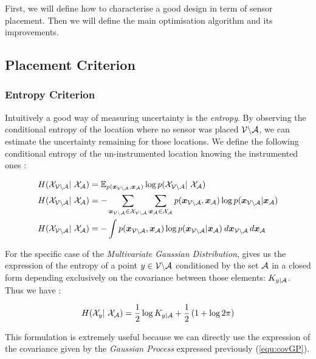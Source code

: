 First, we will define how to characterise a good design in term of sensor placement. Then we will define the main optimisation algorithm and its improvements. \\ 

\subsection{Placement Criterion}

\subsubsection{Entropy Criterion}

Intuitively a good way of measuring uncertainty is the \textit{entropy}. By observing the conditional entropy of the location where no sensor was placed $\mathcal{V} \backslash\mathcal{A}$, we can estimate the uncertainty remaining for those locations. We define the following conditional entropy of the un-instrumented location knowing the instrumented ones \citep[p.~16]{cover_elements_1991} :

\begin{align}
    H(\X_{\VA} | \X_\A) &= \mathbb{E}_{p(\vec{x}_{\VA},\vec{x}_\A)} \log p(\X_{\VA} | \X_\A) \\
    H(\X_{\VA} | \X_\A) &= - \sum_{\vec{x}_{\VA} \in \X_{\VA}}\sum_{\vec{x}_{\A} \in \X_{\A}} p(\vec{x}_{\VA},\vec{x}_\A) \log p(\vec{x}_{\VA}|\vec{x}_\A) \\
    H(\X_{\VA} | \X_\A) &= - \int p(\vec{x}_{\VA},\vec{x}_\A) \log p(\vec{x}_{\VA}|\vec{x}_\A) \: d\vec{x}_{\VA} \, d\vec{x}_\A 
\end{align}

For the specific case of the \textit{Multivariate Gaussian Distribution}, \citet{krause_near-optimal_2008} gives us the expression of the entropy of a point $y \in \mathcal{V} \backslash\mathcal{A}$ conditioned by the set $\mathcal{A}$ in a closed form depending exclusively on the covariance between those elements: $K_{y | \mathcal{A}}$. Thus we have :  

\begin{equation}
    H(\X_{y} | \X_\A) = \frac{1}{2} \log K_{y | \A} + \frac{1}{2} \left(1 + \log 2\pi  \right) \label{equ:entGP}
\end{equation}

This formulation is extremely useful because we can directly use the expression of the covariance given by the \textit{Gaussian Process} expressed previously (\ref{equ:covGP}). \\


